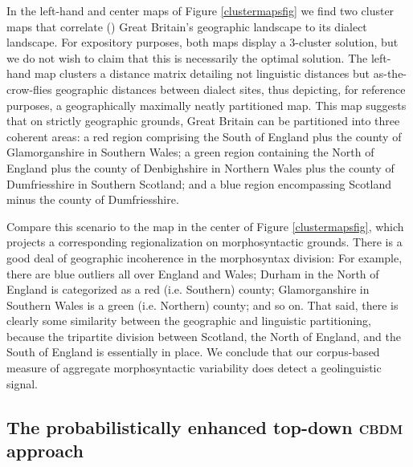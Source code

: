 \documentclass[output=paper]{LSP/langsci}
\begin{document}
In the left-hand and center maps of Figure \ref{clustermapsfig} we find two cluster maps that correlate (\citealt{goebl_dialectometrie_2005}) Great Britain's geographic landscape to its dialect landscape. For expository purposes, both maps display a 3-cluster solution, but we do not wish to claim that this is necessarily the optimal solution. The left-hand map clusters a distance matrix detailing not linguistic distances but as-the-crow-flies geographic distances between dialect sites, thus depicting, for reference purposes, a geographically maximally neatly partitioned map. This map suggests that on strictly geographic grounds, Great Britain can be partitioned into three coherent areas: a red region comprising  the South of England plus the county of Glamorganshire in Southern Wales; a green region containing the North of England plus the county of Denbighshire in Northern Wales plus the county of Dumfriesshire in Southern Scotland; and a blue region encompassing Scotland minus the county of Dumfriesshire.

Compare this scenario to the map in the center of Figure \ref{clustermapsfig}, which projects a corresponding regionalization on morphosyntactic grounds. There is a good deal of geographic incoherence in the morphosyntax division: For example, there are blue outliers all over England and Wales; Durham in the North of England is categorized as a red (i.e. Southern) county; Glamorganshire in Southern Wales is a green (i.e. Northern) county; and so on. That said, there is clearly some similarity between the geographic and linguistic partitioning, because the tripartite division between Scotland, the North of England, and the South of England is essentially in place. We conclude that our corpus-based measure of aggregate morphosyntactic variability does detect a geolinguistic signal.



\subsection{The probabilistically enhanced top-down \textsc{cbdm} approach}
\label{sec:prob}
\end{document}
